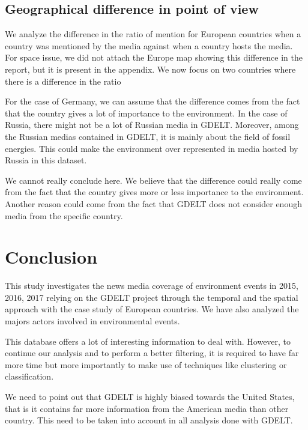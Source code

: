 \documentclass[11pt]{article}
\begin{document}
\subsection{Geographical difference in point of view}
We analyze the difference in the ratio of mention for European countries when a country was mentioned by the media against when a country hosts the media. For space issue, we did not attach the Europe map showing this difference in the report, but it is present in the appendix. We now focus on two countries where there is a difference in the ratio

For the case of Germany, we can assume that the difference comes from the fact that the country gives a lot of importance to the environment. In the case of Russia, there might not be a lot of Russian media in GDELT. Moreover, among the Russian medias contained in GDELT, it is mainly about the field of fossil energies. This could make the environment over represented in media hosted by Russia in this dataset.

We cannot really conclude here. We believe that the difference could really come from the fact that the country gives more or less importance to the environment. Another reason could come from the fact that GDELT does not consider enough media from the specific country. 

\section{Conclusion}
This study investigates the news media coverage of environment events in 2015, 2016, 2017 relying on the GDELT project through the temporal and the spatial approach with the case study of European countries. We have also analyzed the majors actors involved in environmental events.

This database offers a lot of interesting information to deal with. However, to continue our analysis and to perform a better filtering, it is required to have far more time but more importantly to make use of techniques like clustering or classification.

We need to point out that GDELT is highly biased towards the United States, that is it contains far more information from the American media than other country. This need to be taken into account in all analysis done with GDELT.
\end{document}

